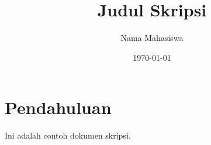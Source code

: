 \documentclass{scrartcl}
\title{Judul Skripsi}
\author{Nama Mahasiswa}
\date{\today}
\begin{document}
\maketitle
\section{Pendahuluan}
Ini adalah contoh dokumen skripsi.
\end{document}

